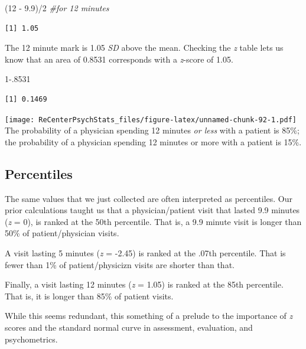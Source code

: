 \documentclass[
  11pt,
]{book}
\newenvironment{Shaded}{\begin{snugshade}}{\end{snugshade}}
\newcommand{\CommentTok}[1]{\textcolor[rgb]{0.56,0.35,0.01}{\textit{#1}}}
\newcommand{\DecValTok}[1]{\textcolor[rgb]{0.00,0.00,0.81}{#1}}
\newcommand{\FloatTok}[1]{\textcolor[rgb]{0.00,0.00,0.81}{#1}}
\newcommand{\NormalTok}[1]{#1}
\newcommand{\SpecialCharTok}[1]{\textcolor[rgb]{0.00,0.00,0.00}{#1}}
\begin{document}
\begin{Shaded}
\begin{Highlighting}[]
\NormalTok{(}\DecValTok{12} \SpecialCharTok{{-}} \FloatTok{9.9}\NormalTok{)}\SpecialCharTok{/}\DecValTok{2}  \CommentTok{\#for 12 minutes}
\end{Highlighting}
\end{Shaded}

\begin{verbatim}
[1] 1.05
\end{verbatim}

The 12 minute mark is 1.05 \emph{SD} above the mean. Checking the \emph{z} table lets us know that an area of 0.8531 corresponds with a \emph{z}-score of 1.05.

\begin{Shaded}
\begin{Highlighting}[]
\DecValTok{1}\FloatTok{{-}.8531}
\end{Highlighting}
\end{Shaded}

\begin{verbatim}
[1] 0.1469
\end{verbatim}

\texttt{[image: ReCenterPsychStats\_files/figure-latex/unnamed-chunk-92-1.pdf]}
The probability of a physician spending 12 minutes \emph{or less} with a patient is 85\%; the probability of a physician spending 12 minutes or more with a patient is 15\%.

\hypertarget{percentiles}{%
\subsection{Percentiles}\label{percentiles}}

The same values that we just collected are often interpreted as percentiles. Our prior calculations taught us that a physician/patient visit that lasted 9.9 minutes (\emph{z} = 0), is ranked at the 50th percentile. That is, a 9.9 minute visit is longer than 50\% of patient/physician visits.

A visit lasting 5 minutes (\emph{z} = -2.45) is ranked at the .07th percentile. That is fewer than 1\% of patient/physicizn visits are shorter than that.

Finally, a visit lasting 12 minutes (\emph{z} = 1.05) is ranked at the 85th percentile. That is, it is longer than 85\% of patient visits.

While this seems redundant, this something of a prelude to the importance of \emph{z} scores and the standard normal curve in assessment, evaluation, and psychometrics.
\end{document}
